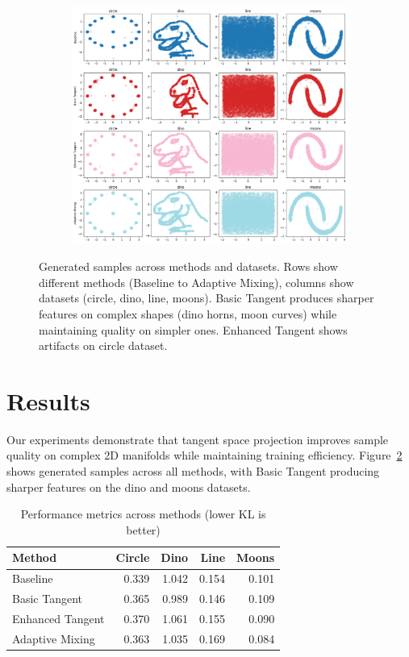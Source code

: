 \documentclass[final]{iclr2024_conference}
\begin{document}
\begin{figure}[t]
    \centering
    \begin{subfigure}{0.9\textwidth}
        \includegraphics[width=\textwidth]{generated_images.png}
        \label{fig:diffusion-samples}
    \end{subfigure}
    \caption{Generated samples across methods and datasets. Rows show different methods (Baseline to Adaptive Mixing), columns show datasets (circle, dino, line, moons). Basic Tangent produces sharper features on complex shapes (dino horns, moon curves) while maintaining quality on simpler ones. Enhanced Tangent shows artifacts on circle dataset.}
    \label{fig:first_figure}
\end{figure}

\section{Results}
\label{sec:results}

Our experiments demonstrate that tangent space projection improves sample quality on complex 2D manifolds while maintaining training efficiency. Figure~\ref{fig:first_figure} shows generated samples across all methods, with Basic Tangent producing sharper features on the dino and moons datasets.

\begin{table}[t]
\centering
\caption{Performance metrics across methods (lower KL is better)}
\begin{tabular}{lrrrr}
\toprule
Method & Circle & Dino & Line & Moons \\
\midrule
Baseline & 0.339 & 1.042 & 0.154 & 0.101 \\
Basic Tangent & 0.365 & 0.989 & 0.146 & 0.109 \\
Enhanced Tangent & 0.370 & 1.061 & 0.155 & 0.090 \\
Adaptive Mixing & 0.363 & 1.035 & 0.169 & 0.084 \\
\bottomrule
\end{tabular}
\label{tab:results}
\end{table}
\end{document}

